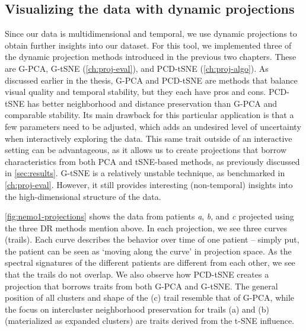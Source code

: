 \subsection{Visualizing the data with dynamic projections}
\label{sec:nemo_pipeline_dr}
%
Since our data is multidimensional and temporal, we use dynamic projections to obtain further insights into our dataset.
For this tool, we implemented three of the dynamic projection methods introduced in the previous two chapters. These are G-PCA, G-tSNE (\cref{ch:proj-eval}), and PCD-tSNE (\cref{ch:proj-algo}). 
As discussed earlier in the thesis, G-PCA and PCD-tSNE are methods that balance visual quality and temporal stability, but they each have pros and cons. PCD-tSNE has better neighborhood and distance preservation than G-PCA and comparable stability. Its main drawback for this particular application is that a few parameters need to be adjusted, which adds an undesired level of uncertainty when interactively exploring the data. This same trait outside of an interactive setting can be advantageous, as it allows us to create projections that borrow characteristics from both PCA and tSNE-based methods, as previously discussed in \cref{sec:results}. %
G-tSNE is a relatively unstable technique, as benchmarked in \cref{ch:proj-eval}. However, it still provides interesting (non-temporal) insights into the high-dimensional structure of the data.

\cref{fig:nemo1-projections} shows the data from patients \textit{a}, \textit{b}, and \textit{c} projected using the three DR methods mention above. In each projection, we see three curves (trails). Each curve describes the behavior over time of one patient -- simply put, the patient can be seen as `moving along the curve' in projection space. As the spectral signatures of the different patients are different from each other, we see that the trails do not overlap. We also observe how PCD-tSNE creates a projection that borrows traits from both G-PCA and G-tSNE. The general position of all clusters and shape of the (c) trail resemble that of G-PCA, while the focus on intercluster neighborhood preservation for trails (a) and (b) (materialized as expanded clusters) are traits derived from the t-SNE influence.

